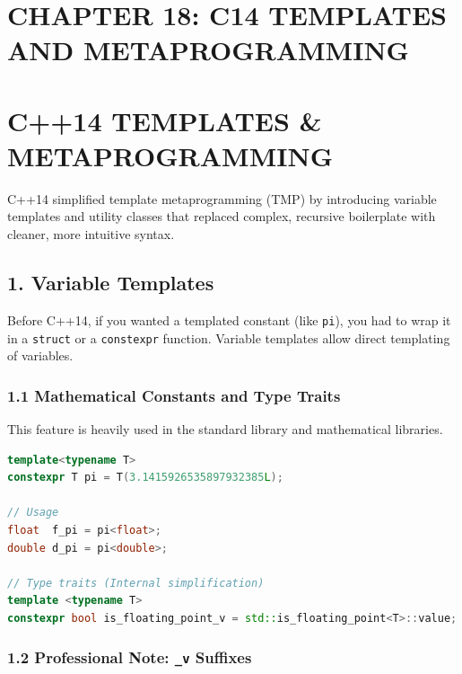 \hypertarget{chapter-18-c14-templates-and-metaprogramming}{%
\section{CHAPTER 18: C14 TEMPLATES AND
METAPROGRAMMING}\label{chapter-18-c14-templates-and-metaprogramming}}

\hypertarget{c14-templates-metaprogramming}{%
\section{C++14 TEMPLATES \&
METAPROGRAMMING}\label{c14-templates-metaprogramming}}

C++14 simplified template metaprogramming (TMP) by introducing variable
templates and utility classes that replaced complex, recursive
boilerplate with cleaner, more intuitive syntax.

\hypertarget{variable-templates}{%
\subsection{1. Variable Templates}\label{variable-templates}}

Before C++14, if you wanted a templated constant (like
\passthrough{\lstinline!pi!}), you had to wrap it in a
\passthrough{\lstinline!struct!} or a
\passthrough{\lstinline!constexpr!} function. Variable templates allow
direct templating of variables.

\hypertarget{mathematical-constants-and-type-traits}{%
\subsubsection{1.1 Mathematical Constants and Type
Traits}\label{mathematical-constants-and-type-traits}}

This feature is heavily used in the standard library and mathematical
libraries.

\begin{lstlisting}[language={C++}]
template<typename T>
constexpr T pi = T(3.1415926535897932385L);

// Usage
float  f_pi = pi<float>;
double d_pi = pi<double>;

// Type traits (Internal simplification)
template <typename T>
constexpr bool is_floating_point_v = std::is_floating_point<T>::value;
\end{lstlisting}

\hypertarget{professional-note-_v-suffixes}{%
\subsubsection{\texorpdfstring{1.2 Professional Note: \texttt{\_v}
Suffixes}{1.2 Professional Note: \_v Suffixes}}\label{professional-note-_v-suffixes}}

